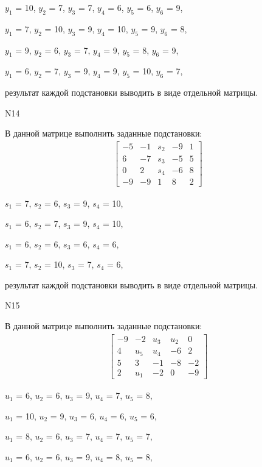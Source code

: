 \documentclass[11pt]{report}
\begin{document}
$y_{1}$ = 10, $y_{2}$ = 7, $y_{3}$ = 7, $y_{4}$ = 6, $y_{5}$ = 6, $y_{6}$ = 9, 

$y_{1}$ = 7, $y_{2}$ = 10, $y_{3}$ = 9, $y_{4}$ = 10, $y_{5}$ = 9, $y_{6}$ = 8, 

$y_{1}$ = 9, $y_{2}$ = 6, $y_{3}$ = 7, $y_{4}$ = 9, $y_{5}$ = 8, $y_{6}$ = 9, 

$y_{1}$ = 6, $y_{2}$ = 7, $y_{3}$ = 9, $y_{4}$ = 9, $y_{5}$ = 10, $y_{6}$ = 7, 

результат каждой подстановки выводить в виде отдельной матрицы.

N14

В данной матрице выполнить заданные подстановки:
\begin{align*}
\left[\begin{matrix}-5 & -1 & s_{2} & -9 & 1\\6 & -7 & s_{3} & -5 & 5\\0 & 2 & s_{4} & -6 & 8\\-9 & -9 & 1 & 8 & 2\end{matrix}\right]
\end{align*}


$s_{1}$ = 7, $s_{2}$ = 6, $s_{3}$ = 9, $s_{4}$ = 10, 

$s_{1}$ = 6, $s_{2}$ = 7, $s_{3}$ = 9, $s_{4}$ = 10, 

$s_{1}$ = 6, $s_{2}$ = 6, $s_{3}$ = 6, $s_{4}$ = 6, 

$s_{1}$ = 7, $s_{2}$ = 10, $s_{3}$ = 7, $s_{4}$ = 6, 

результат каждой подстановки выводить в виде отдельной матрицы.

N15

В данной матрице выполнить заданные подстановки:
\begin{align*}
\left[\begin{matrix}-9 & -2 & u_{3} & u_{2} & 0\\4 & u_{5} & u_{4} & -6 & 2\\5 & 3 & -1 & -8 & -2\\2 & u_{1} & -2 & 0 & -9\end{matrix}\right]
\end{align*}


$u_{1}$ = 6, $u_{2}$ = 6, $u_{3}$ = 9, $u_{4}$ = 7, $u_{5}$ = 8, 

$u_{1}$ = 10, $u_{2}$ = 9, $u_{3}$ = 6, $u_{4}$ = 6, $u_{5}$ = 6, 

$u_{1}$ = 8, $u_{2}$ = 6, $u_{3}$ = 7, $u_{4}$ = 7, $u_{5}$ = 7, 

$u_{1}$ = 6, $u_{2}$ = 6, $u_{3}$ = 9, $u_{4}$ = 8, $u_{5}$ = 8, 
\end{document}

